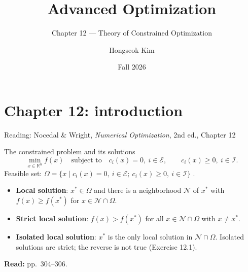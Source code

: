 \documentclass[aspectratio=169,12pt]{beamer}
\title{Advanced Optimization}
\subtitle{Chapter 12 --- Theory of Constrained Optimization}
\author{Hongseok Kim}
\institute{Department of Electronic Engineering, Sogang University}
\date{Fall 2026}
\newcommand{\R}{\mathbb{R}}
\newcommand{\xs}{x^{*}}
\newcommand{\eqn}[1]{\text{\small(#1)}}
\newcommand{\readbook}[1]{{\color{red}\textbf{Read:} #1}}
\newcommand{\cE}{\mathcal{E}}
\newcommand{\cI}{\mathcal{I}}
\begin{document}
\section{Chapter 12: introduction}

\begin{frame}
  \titlepage
  \begin{center}\small
    Reading: Nocedal \& Wright, \emph{Numerical Optimization}, 2nd ed., Chapter 12
  \end{center}
\end{frame}

\begin{frame}{The constrained problem and its solutions}
  \[ \min_{x\in\R^{n}} f(x)\quad\text{subject to}\quad
     c_{i}(x)=0,\ i\in\cE,\qquad c_{i}(x)\ge 0,\ i\in\cI . \tag{12.1} \]
  Feasible set:
  $\Omega=\{x\mid c_{i}(x)=0,\ i\in\cE;\ c_{i}(x)\ge 0,\ i\in\cI\}$ \eqn{12.2}.
  \begin{itemize}\setlength\itemsep{0.5em}
    \item \textbf{Local solution}: $\xs\in\Omega$ and there is a neighborhood $\mathcal{N}$ of $\xs$
      with $f(x)\ge f(\xs)$ for $x\in\mathcal{N}\cap\Omega$.
    \item \textbf{Strict local solution}: $f(x)>f(\xs)$ for all $x\in\mathcal{N}\cap\Omega$ with $x\ne\xs$.
    \item \textbf{Isolated local solution}: $\xs$ is the only local solution in $\mathcal{N}\cap\Omega$.
      Isolated solutions are strict; the reverse is not true (Exercise 12.1).
  \end{itemize}
  \vspace{0.5em}
  \readbook{pp.~304--306.}
\end{frame}
\end{document}
